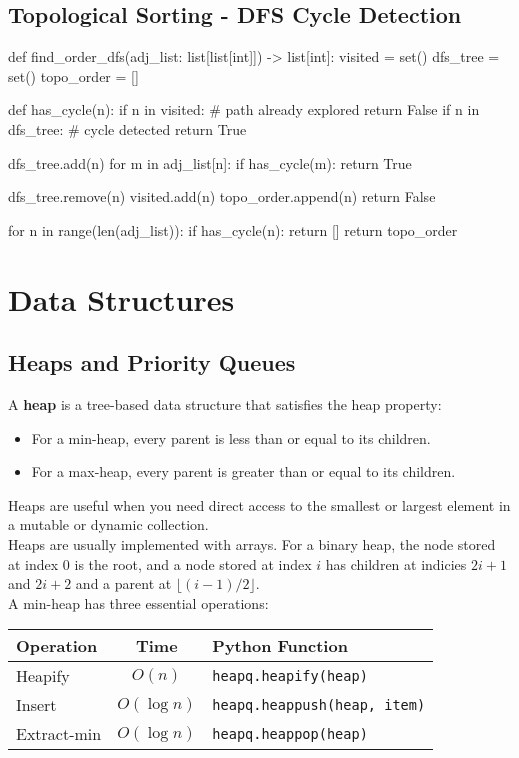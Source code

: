 \documentclass[12pt, titlepage]{article}
\newcommand{\floor}[1]{\lfloor #1 \rfloor}
\begin{document}
\subsection{Topological Sorting - DFS Cycle Detection}
\begin{python}
def find_order_dfs(adj_list: list[list[int]]) -> list[int]:
    visited = set()
    dfs_tree = set()
    topo_order = []

    def has_cycle(n):
        if n in visited:  # path already explored
            return False
        if n in dfs_tree:  # cycle detected
            return True

        dfs_tree.add(n)
        for m in adj_list[n]:
            if has_cycle(m):
                return True

        dfs_tree.remove(n)
        visited.add(n)
        topo_order.append(n)
        return False

    for n in range(len(adj_list)):
        if has_cycle(n):
            return []
    return topo_order
\end{python}

\section{Data Structures}

\subsection{Heaps and Priority Queues}

A \textbf{heap} is a tree-based data structure that satisfies the heap property:
\begin{itemize}
  \item For a min-heap, every parent is less than or equal to its children.
  \item For a max-heap, every parent is greater than or equal to its children.
\end{itemize}

Heaps are useful when you need direct access to the smallest or largest element in a mutable or dynamic collection. \\

Heaps are usually implemented with arrays. For a binary heap, the node stored at index $0$ is the root, and a node stored at index $i$ has children at indicies $2i + 1$ and $2i + 2$ and a parent at $\floor{(i - 1)/2}$. \\

A min-heap has three essential operations:
\begin{center}
\begin{tabular}{|l|c|l|}
  \hline
  \textbf{Operation} & \textbf{Time} & \textbf{Python Function} \\
  \hline
  Heapify & $O(n)$ & \texttt{heapq.heapify(heap)} \\
  Insert & $O(\log n)$ & \texttt{heapq.heappush(heap, item)} \\
  Extract-min & $O(\log n)$ & \texttt{heapq.heappop(heap)} \\
  \hline
\end{tabular}
\end{center}
\end{document}
